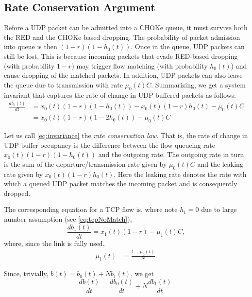 \documentclass{IEEEtran}
\begin{document}
\subsection{Rate Conservation Argument}\label{subsec:rateConservation}
    Before a UDP packet can be admitted into a CHOKe queue, it must survive both the RED and the CHOKe based dropping. The probability of packet admission into queue is then $(1-r)(1-h_0(t))$. Once in the queue, UDP packets can still be lost. This is because incoming packets that evade RED-based dropping (with probability $1-r$) may trigger flow matching (with probability $h_0(t)$) and cause dropping of the matched packets. In addition, UDP packets can also leave the queue due to transmission with rate $\mu_0(t)C$. Summarizing, we get a system invariant that captures the rate of change in UDP buffered packets as follows:
    \begin{align}
\frac{db_0(t)}{dt}  &=x_0(t)(1-r)(1-h_0(t))-x_0(t)(1-r)h_0(t)-\mu_0(t)C \nonumber \\
                        & =x_0(t)(1-r)(1-2h_0(t))-\mu_0(t)C    \label{eq:invariance}
    \end{align}



    Let us call \eqref{eq:invariance} the \emph{ rate conservation law}. That is, the rate of change in UDP buffer occupancy is the difference between the flow queueing rate $x_0(t)(1-r)(1-h_0(t))$ and the outgoing rate. The outgoing rate in turn is the sum of the departure/transmission rate given by $\mu_0(t)C$ and the leaking rate given by $x_0(t)(1-r)h_0(t)$. Here the leaking rate denotes the rate with which a queued UDP packet matches the incoming packet and is consequently dropped.

   The corresponding equation for a TCP flow is, where note $h_1=0$ due to large number assumption (see \eqref{eq:tcpNoMatch}),
    \begin{equation}\label{eq:tcp_invariance}
        \frac{db_1(t)}{dt}  =  x_1(t)(1-r)- \mu_1(t)C,
    \end{equation}
    where, since the link is fully used,
    \begin{align}\label{eq:mu_1}
        \mu_1(t)    &=  \frac{1-\mu_0(t)}{N}.
    \end{align}

   Since, trivially, $b(t)=b_0(t)+Nb_1(t)$, we get
   \begin{equation}\label{eq:b(t)invariance}
        \frac{db(t)}{dt}= \frac{db_0(t)}{dt} + N\frac{db_1(t)}{dt}.
\end{equation}
\end{document}
